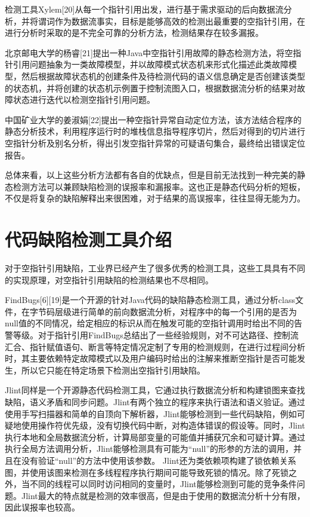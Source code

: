 检测工具Xylem[20]从每一个指针引用出发，进行基于需求驱动的后向数据流分析，并将谓词作为数据流事实，目标是能够高效的检测出最重要的空指针引用，在进行分析时采取的是不完全可靠的分析方法，检测结果存在较多漏报。

北京邮电大学的杨睿[21]提出一种Java中空指针引用故障的静态检测方法，将空指针引用问题抽象为一类故障模型，并以故障模式状态机来形式化描述此类故障模型，然后根据故障状态机的创建条件及待检测代码的语义信息确定是否创建该类型的状态机，并将创建的状态机示例置于控制流图入口，根据数据流分析的结果对故障状态进行迭代以检测空指针引用问题。

中国矿业大学的姜淑娟[22]提出一种空指针异常自动定位方法，该方法结合程序的静态分析技术，利用程序运行时的堆栈信息指导程序切片，然后对得到的切片进行空指针分析及别名分析，得出引发空指针异常的可疑语句集合，最终给出错误定位报告。

总体来看，以上这些分析方法都有各自的优缺点，但是目前无法找到一种完美的静态检测方法可以兼顾缺陷检测的误报率和漏报率。这也正是静态代码分析的短板，不仅是将复杂的缺陷解释出来很困难，对于结果的高误报率，往往显得无能为力。

\section{代码缺陷检测工具介绍}
对于空指针引用缺陷，工业界已经产生了很多优秀的检测工具，这些工具具有不同的实现原理，对空指针引用缺陷的检测结果也不尽相同。

FindBugs[6][19]是一个开源的针对Java代码的缺陷静态检测工具，通过分析class文件，在字节码层级进行简单的前向数据流分析，对程序中的每一个引用的是否为null值的不同情况，给定相应的标识从而在触发可能的空指针调用时给出不同的告警等级。对于指针引用FindBugs总结出了一些经验规则，对不可达路径、控制流汇合、指针赋值语句、断言等特定情况定制了专用的检测规则，在进行过程间分析时，其主要依赖特定故障模式以及用户编码时给出的注解来推断空指针是否可能发生，所以它只能在特定场景下检测出空指针引用缺陷。

Jlint同样是一个开源静态代码检测工具，它通过执行数据流分析和构建锁图来查找缺陷，语义矛盾和同步问题。Jlint有两个独立的程序来执行语法和语义验证。通过使用手写扫描器和简单的自顶向下解析器，Jlint能够检测到一些代码缺陷，例如可疑地使用操作符优先级，没有切换代码中断，对构造体错误的假设等。同时，Jlint执行本地和全局数据流分析，计算局部变量的可能值并捕获冗余和可疑计算。通过执行全局方法调用分析，Jlint能够检测具有可能为“null”的形参的方法的调用，并且在没有验证“null”的方法中使用该参数。 Jlint还为类依赖项构建了锁依赖关系图，并使用该图来检测在多线程程序执行期间可能导致死锁的情况。除了死锁之外，当不同的线程可以同时访问相同的变量时，Jlint能够检测到可能的竞争条件问题。Jlint最大的特点就是检测的效率很高，但是由于使用的数据流分析十分有限，因此误报率也较高。


